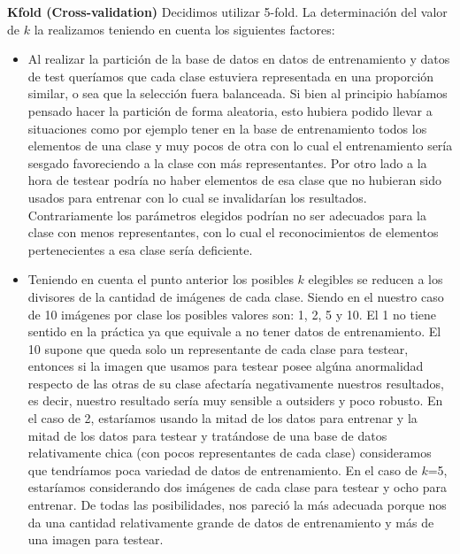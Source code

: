 \textbf{Kfold (Cross-validation)}
Decidimos utilizar 5-fold.
La determinación del valor de $k$ la realizamos teniendo en cuenta los siguientes factores:
\begin{itemize}
\item Al realizar la partición de la base de datos en datos de entrenamiento y datos de test queríamos que cada clase estuviera representada en una proporción similar, o sea que la selección fuera balanceada. Si bien al principio habíamos pensado hacer la partición de forma aleatoria, esto hubiera podido llevar a situaciones como por ejemplo tener en la base de entrenamiento todos los elementos de una clase y muy pocos de otra con lo cual el entrenamiento sería sesgado favoreciendo a la clase con más representantes. Por otro lado a la hora de testear podría no haber elementos de esa clase que no hubieran sido usados para entrenar con lo cual se invalidarían los resultados. Contrariamente los parámetros elegidos podrían no ser adecuados para la clase con menos representantes, con lo cual el reconocimientos de elementos pertenecientes a esa clase sería deficiente.

\item Teniendo en cuenta el punto anterior los posibles $k$ elegibles se reducen a los divisores de la cantidad de imágenes de cada clase. Siendo en el nuestro caso de 10 imágenes por clase los posibles valores son: 1, 2, 5 y 10. El 1 no tiene sentido en la práctica ya que equivale a no tener datos de entrenamiento. El 10 supone que queda solo un representante de cada clase para testear, entonces si la imagen que usamos para testear posee algúna anormalidad respecto de las otras de su clase afectaría negativamente nuestros resultados, es decir, nuestro resultado sería muy sensible a outsiders y poco robusto. En el caso de 2, estaríamos usando la mitad de los datos para entrenar y la mitad de los datos para testear y tratándose de una base de datos relativamente chica (con pocos representantes de cada clase) consideramos que tendríamos poca variedad de datos de entrenamiento. En el caso de $k$=5, estaríamos considerando dos imágenes de cada clase para testear y ocho para entrenar. De todas las posibilidades, nos pareció la más adecuada porque nos da una cantidad relativamente grande de datos de entrenamiento y más de una imagen para testear. 
\end{itemize}

